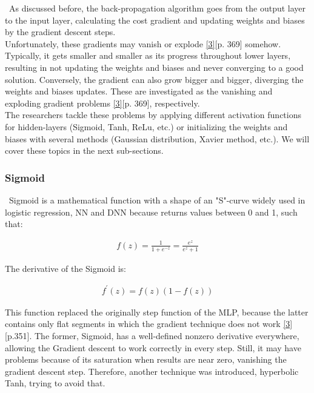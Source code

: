\quad \, As discussed before, the back-propagation algorithm goes from the output layer to the input layer, calculating the cost gradient and updating weights and biases by the gradient descent steps.\\

Unfortunately, these gradients may vanish or explode \hyperref[Bib:Hands-on Machine Learning]{[3]}[p. 369] somehow. Typically, it gets smaller and smaller as its progress throughout lower layers, resulting in not updating the weights and biases and never converging to a good solution. Conversely, the gradient can also grow bigger and bigger, diverging the weights and biases updates. These are investigated as the vanishing and exploding gradient problems \hyperref[Bib:Hands-on Machine Learning]{[3]}[p. 369], respectively.\\

The researchers tackle these problems by applying different activation functions for hidden-layers (Sigmoid, Tanh, ReLu, etc.) or initializing the weights and biases with several methods (Gaussian distribution, Xavier method, etc.). We will cover these topics in the next sub-sections.

\subsubsection{Sigmoid}
\label{chap:Sigmoid}

\quad \, Sigmoid is a mathematical function with a shape of an "S"-curve widely used in logistic regression, NN and DNN because returns values between 0 and 1, such that:

\begin{align*}
f(z) = \frac{1}{1 + e^{-z}} = \frac{e^{z}}{e^{z}+1}
\end{align*}

The derivative of the Sigmoid is:

\begin{align*}
f^{'}(z) = f(z) (1 - f(z))
\end{align*}

This function replaced the originally step function of the MLP, because the latter contains only flat segments in which the gradient technique does not work \hyperref[Bib:Hands-on Machine Learning]{[3]}[p.351]. The former, Sigmoid, has a well-defined nonzero derivative everywhere, allowing the Gradient descent to work correctly in every step. Still, it may have problems because of its saturation when results are near zero, vanishing the gradient descent step. Therefore, another technique was introduced, hyperbolic Tanh, trying to avoid that.


